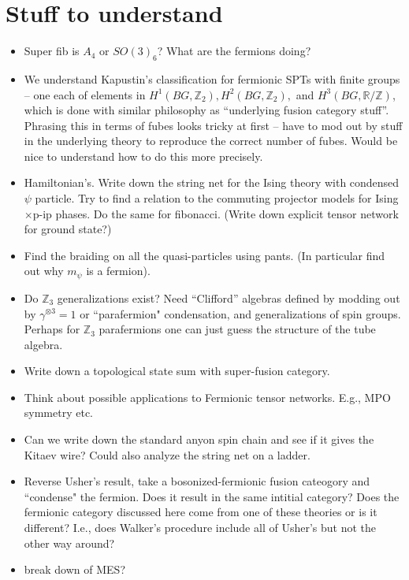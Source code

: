 \documentclass[12pt,a4paper]{article}
\newcommand{\tp}{\otimes}
\newcommand{\zz}{\mathbb{Z}}
\newcommand{\rr}{\mathbb{R}}
\newcommand{\zt}{\mathbb{Z}_2}
\begin{document}
\section{Stuff to understand}

\begin{itemize}
    \item Super fib is $A_4$ or $SO(3)_6$? What are the fermions doing?
    \item We understand Kapustin's classification for fermionic SPTs with finite groups -- one each of elements in $H^1(BG,\zt),H^2(BG,\zt),$ and $H^3(BG,\rr/\zz)$, which is done with similar philosophy as ``underlying fusion category stuff''. Phrasing this in terms of fubes looks tricky at first -- have to mod out by stuff in the underlying theory to reproduce the correct number of fubes. Would be nice to understand how to do this more precisely. 
    \item Hamiltonian's. Write down the string net for the Ising theory with condensed $\psi$ particle.
    Try to find a relation to the commuting projector models for Ising$\times$p-ip phases. 
    Do the same for fibonacci.
    (Write down explicit tensor network for ground state?)
    \item Find the braiding on all the quasi-particles using pants. (In particular find out why $m_\psi$ is a fermion). 
    \item Do $\mathbb{Z}_3$ generalizations exist? Need ``Clifford'' algebras defined by modding out by $\gamma^{\tp 3} = 1$ or ``parafermion" condensation, and generalizations of spin groups.
    Perhaps for $\mathbb{Z}_3$ parafermions one can just guess the structure of the tube algebra.
    \item Write down a topological state sum with super-fusion category. 
    \item Think about possible applications to Fermionic tensor networks. E.g., MPO symmetry etc. 
    \item Can we write down the standard anyon spin chain and see if it gives the Kitaev wire? Could also analyze the string net on a ladder. 
    \item Reverse Usher's result, take a bosonized-fermionic fusion cateogory and ``condense" the fermion. Does it result in the same intitial category? Does the fermionic category discussed here come from one of these theories or is it different? I.e., does Walker's procedure include all of Usher's but not the other way around?
    \item break down of MES?
\end{itemize}
\end{document}
